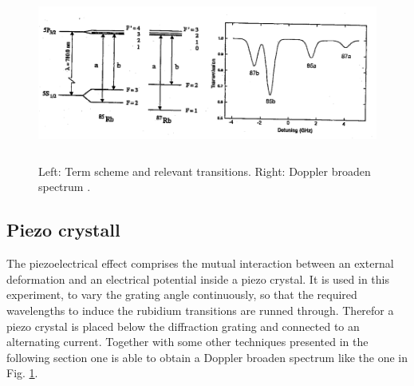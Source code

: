\begin{figure}
  \centering
  \includegraphics[height=5.8cm]{Ordnername/dopplerandterm.png}
  \caption{Left: Term scheme and relevant transitions. Right: Doppler broaden spectrum \cite{manual}.}
  \label{fig:dopplerandterm}
\end{figure}

\subsection{Piezo crystall}

The piezoelectrical effect comprises the mutual interaction between an external deformation and an
electrical potential inside a piezo crystal. It is used in this experiment, to vary the grating
angle continuously, so that the required wavelengths to induce the rubidium transitions are runned through.
Therefor a piezo crystal is placed below the diffraction grating and connected to an alternating current.
Together with some other techniques presented in the following section one is able to obtain a
Doppler broaden spectrum like the one in Fig. \ref{fig:dopplerandterm}.

